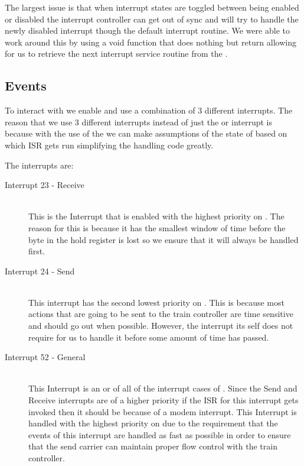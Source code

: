\documentclass[pdftex,10pt,a4paper]{article}
\begin{document}
The largest issue is that when interrupt states are toggled between being
enabled or disabled the interrupt controller can get out of sync and will try
to handle the newly disabled interrupt though the default interrupt routine.
We were able to work around this by using a void function that does nothing but
return allowing for us to retrieve the next interrupt service routine from the
.

\subsection*{ Events}
To interact with  we enable and use a combination of 3 different
interrupts. The reason that we use 3 different interrupts instead of just the
 or interrupt is because with the use of the  we can make
assumptions of the state of  based on which ISR gets run simplifying
the  handling code greatly.

The interrupts are:
\begin{description}
\item[Interrupt 23 -  Receive] \hfill \\
	This is the Interrupt that is enabled with the highest priority on
	. The reason for this is because it has the smallest window
	of time before the byte in the hold register is lost so we ensure that
	it will always be handled first.
\item[Interrupt 24 -  Send] \hfill \\
	This interrupt has the second lowest priority on . This is
	because most actions that are going to be sent to the train controller
	are time sensitive and should go out when possible. However, the
	interrupt its self does not require for us to handle it before some
	amount of time has passed.
\item[Interrupt 52 -  General] \hfill \\
	This Interrupt is an or of all of the interrupt cases of .
	Since the  Send and Receive interrupts are of a higher
	priority if the ISR for this interrupt gets invoked then it should be
	because of a modem interrupt. This Interrupt is handled with the
	highest priority on  due to the requirement that the events
	of this interrupt are handled as fast as possible in order to ensure
	that the  send carrier can maintain proper flow control
	with the train controller.
\end{description}
\end{document}
